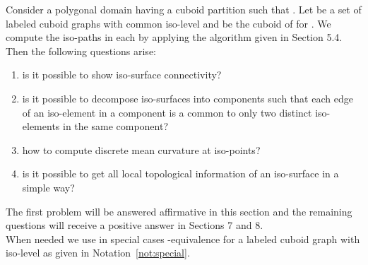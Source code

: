 \documentclass[a4paper,11pt]{article}
\begin{document}
Consider a polygonal domain  having a cuboid partition 
such that . Let  be a set of labeled cuboid
graphs with common iso-level  and  be the cuboid of  for . We compute the
iso-paths in each  by applying the algorithm given in Section 5.4. Then the following questions arise:
\begin{enumerate}
\item is it possible to show iso-surface connectivity?
\item is it possible to decompose iso-surfaces into components such that each edge of an iso-element
in a component is a common to only two distinct iso-elements in the same component?
\item how to compute discrete mean curvature at iso-points?
\item is it possible to get all local topological information of an iso-surface in a simple way?
\end{enumerate}
The first problem will be answered affirmative in this section and the remaining questions will
receive a positive answer in Sections 7 and 8.\\

When needed we use in special cases -equivalence for a labeled cuboid graph
with iso-level  as given in Notation~\ref{not:special}.
\end{document}
